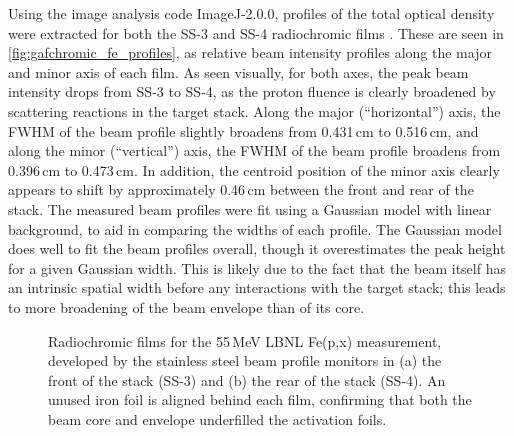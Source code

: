 Using the image analysis code  ImageJ-2.0.0,  profiles of the total optical density were extracted for both the SS-3 and SS-4 radiochromic films \cite{Rueden2017}.
These are seen in \autoref{fig:gafchromic_fe_profiles}, as relative beam intensity profiles along the major and minor axis of each film.
As seen visually, for both axes, the peak beam intensity drops from SS-3 to SS-4, as the proton fluence is clearly broadened by scattering reactions in the target stack.
Along the major (\enquote{horizontal}) axis, the FWHM of the beam profile slightly broadens from 0.431\,cm to 0.516\,cm, and along the minor (\enquote{vertical}) axis, the FWHM of the beam profile broadens from 0.396\,cm to 0.473\,cm.
In addition, the centroid position of the minor axis clearly appears to  shift by approximately 0.46\,cm between the front and rear of the stack. 
The measured beam profiles were fit using a Gaussian model with linear background, to aid in comparing the widths of each profile.
The Gaussian model does well to fit the beam profiles overall, though it overestimates the peak height for a given Gaussian width.
This is likely due to the fact that the beam itself has an intrinsic spatial width before any interactions with the target stack; this leads to more broadening of the beam envelope than of its core.

    

% 
\begin{figure}
    \centering
    \caption{Radiochromic films for the 55\,MeV LBNL Fe(p,x) measurement, developed by the stainless steel beam profile monitors in (a) the front of the stack (SS-3) and (b) the rear of the stack (SS-4). An unused iron  foil is aligned behind each film, confirming that both the beam core and envelope underfilled the activation foils.}
     \label{fig:gafchromic_fe}
\end{figure}




